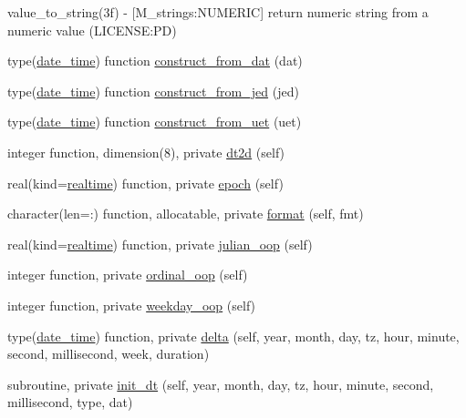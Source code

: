 \begin{DoxyCompactItemize}
\begin{DoxyCompactList}
value\+\_\+to\+\_\+string(3f) -\/ \mbox{[}M\+\_\+strings\+:N\+U\+M\+E\+R\+IC\mbox{]} return numeric string from a numeric value (L\+I\+C\+E\+N\+SE\+:PD) \end{DoxyCompactList}\item 
type(\mbox{\hyperlink{structm__time_1_1date__time}{date\+\_\+time}}) function \mbox{\hyperlink{namespacem__time_a6f7d20403f29656febb82306aa064134}{construct\+\_\+from\+\_\+dat}} (dat)
\item 
type(\mbox{\hyperlink{structm__time_1_1date__time}{date\+\_\+time}}) function \mbox{\hyperlink{namespacem__time_ab7b679d14dabc2a9250f4ec218569f0c}{construct\+\_\+from\+\_\+jed}} (jed)
\item 
type(\mbox{\hyperlink{structm__time_1_1date__time}{date\+\_\+time}}) function \mbox{\hyperlink{namespacem__time_a7d903e5ff714106d933cee618e780a8b}{construct\+\_\+from\+\_\+uet}} (uet)
\item 
integer function, dimension(8), private \mbox{\hyperlink{namespacem__time_aa281690d7f68f14842b00d238702e774}{dt2d}} (self)
\item 
real(kind=\mbox{\hyperlink{namespacem__time_ac10ea9e8d59ec74eaa7d89f2517d7422}{realtime}}) function, private \mbox{\hyperlink{namespacem__time_a64abb0c3f90cb0ae1358ef55ce03c175}{epoch}} (self)
\item 
character(len=\+:) function, allocatable, private \mbox{\hyperlink{namespacem__time_a8d843c997d304f40fd5aed820c5a7473}{format}} (self, fmt)
\item 
real(kind=\mbox{\hyperlink{namespacem__time_ac10ea9e8d59ec74eaa7d89f2517d7422}{realtime}}) function, private \mbox{\hyperlink{namespacem__time_aff0a1b524b578e85efe20b87fbe9db61}{julian\+\_\+oop}} (self)
\item 
integer function, private \mbox{\hyperlink{namespacem__time_a7fb507bb72a1872ec2a86fb7f3a50d75}{ordinal\+\_\+oop}} (self)
\item 
integer function, private \mbox{\hyperlink{namespacem__time_ac43e082c8ffd7687c4fc91beddc15720}{weekday\+\_\+oop}} (self)
\item 
type(\mbox{\hyperlink{structm__time_1_1date__time}{date\+\_\+time}}) function, private \mbox{\hyperlink{namespacem__time_aa623b1643e55ffbf97e4fbd1c7e8c379}{delta}} (self, year, month, day, tz, hour, minute, second, millisecond, week, duration)
\item 
subroutine, private \mbox{\hyperlink{namespacem__time_a72455f763954fae8ebc0f454033d82a8}{init\+\_\+dt}} (self, year, month, day, tz, hour, minute, second, millisecond, type, dat)

\end{DoxyCompactItemize}
